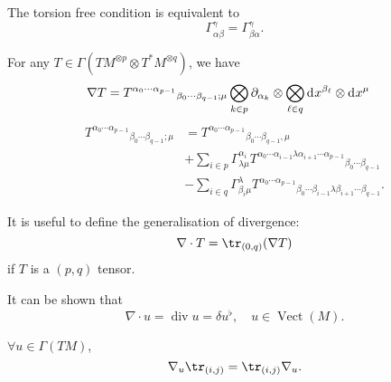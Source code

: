 \documentclass[openany, oneside, a5paper]{book}
\DeclareMathOperator{\Vect}{Vect}
\begin{document}
The torsion free condition is equivalent to
\begin{equation}\label{eq: torsion free (coordinate)}
    \Gamma^\gamma_{\alpha\beta} = \Gamma^\gamma_{\beta\alpha}.
\end{equation}

For any $T \in \Gamma(TM^{\otimes p} \otimes T^*M^{\otimes q})$, we have
\begin{align}
    \nabla T 
    &= {T^{\alpha_0 \cdots \alpha_{p - 1}}}_{\beta_0 \cdots \beta_{q - 1}; \mu} \bigotimes_{k \in p} \partial_{\alpha_k} \otimes \bigotimes_{\ell \in q} \mathop{}\!\mathrm{d}^{} x^{\beta_\ell} \otimes \mathop{}\!\mathrm{d}^{} x^\mu
\end{align}
\begin{align}
    {T^{\alpha_0 \cdots \alpha_{p - 1}}}_{\beta_0 \cdots \beta_{q - 1}; \mu} &= {T^{\alpha_0 \cdots \alpha_{p - 1}}}_{\beta_0 \cdots \beta_{q - 1}, \mu} 
    \\
    &
    + \sum_{i \in p} \Gamma^{\alpha_i}_{\lambda \mu} {T^{\alpha_0 \cdots \alpha_{i-1} \lambda \alpha_{i + 1} \cdots \alpha_{p - 1}}}_{\beta_0 \cdots \beta_{q - 1}}
    \\
    &
    - \sum_{i \in q} \Gamma^{\lambda}_{\beta_i \mu} {T^{\alpha_0 \cdots \alpha_{p - 1}}}_{\beta_0 \cdots \beta_{i-1} \lambda \beta_{i + 1} \cdots \beta_{q - 1}}.
\end{align}

It is useful to define the generalisation of divergence:
\begin{equation}
    \nabla \cdot T = \tr_{(0, q)} (\nabla T)
\end{equation}
if $T$ is a $(p, q)$ tensor.

It can be shown that
\begin{equation}
    \nabla \cdot u = \operatorname{div} u = \delta u^\flat,
    \quad
    u \in \Vect(M).
\end{equation}

\begin{theorem}
    $\forall u \in \Gamma(TM)$,
    \begin{equation}
        \nabla_u \tr_{(i, j)} = \tr_{(i, j)} \nabla_u.
    \end{equation}
\end{theorem}
\end{document}
